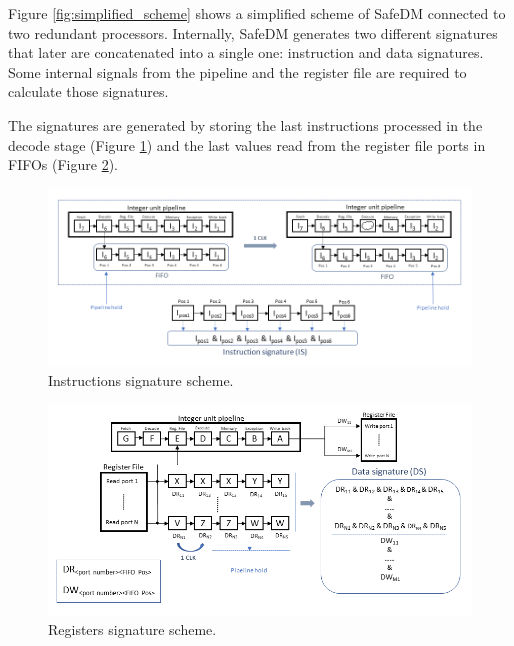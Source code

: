 Figure \ref{fig:simplified_scheme} shows a simplified scheme of SafeDM connected to two redundant processors. Internally, SafeDM generates two different signatures that later are concatenated into a single one: instruction and data signatures. Some internal signals from the pipeline and the register file are required to calculate those signatures.

The signatures are generated by storing the last instructions processed in the decode stage (Figure \ref{fig:instruction_signature}) and the last values read from the register file ports in FIFOs (Figure \ref{fig:register_signature}). 


\begin{figure}[H]
	\includegraphics[keepaspectratio,width=\columnwidth]{img/SafeDM_instructions.png}
        \caption{Instructions signature scheme.} 
	\label{fig:instruction_signature}
\end{figure}

\begin{figure}[H]
	\includegraphics[keepaspectratio,width=\columnwidth]{img/SafeDM_registers.png}
        \caption{Registers signature scheme.}
	\label{fig:register_signature}
\end{figure}


